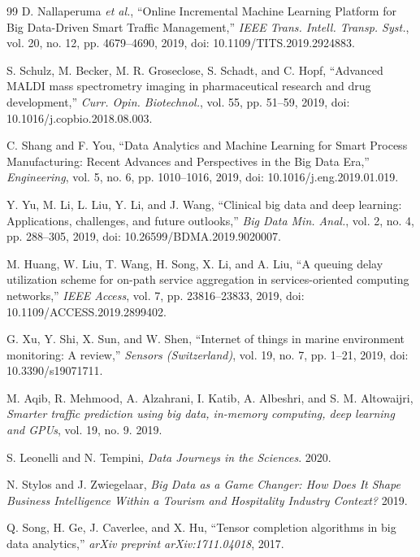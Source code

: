 \documentclass[10pt,a4paper]{article}
\begin{document}
\begin{thebibliography}{99}
D. Nallaperuma \textit{et al.}, ``Online Incremental Machine Learning Platform for Big Data-Driven Smart Traffic Management,'' \textit{IEEE Trans. Intell. Transp. Syst.}, vol. 20, no. 12, pp. 4679--4690, 2019, doi: 10.1109/TITS.2019.2924883.

S. Schulz, M. Becker, M. R. Groseclose, S. Schadt, and C. Hopf, ``Advanced MALDI mass spectrometry imaging in pharmaceutical research and drug development,'' \textit{Curr. Opin. Biotechnol.}, vol. 55, pp. 51--59, 2019, doi: 10.1016/j.copbio.2018.08.003.

C. Shang and F. You, ``Data Analytics and Machine Learning for Smart Process Manufacturing: Recent Advances and Perspectives in the Big Data Era,'' \textit{Engineering}, vol. 5, no. 6, pp. 1010--1016, 2019, doi: 10.1016/j.eng.2019.01.019.

Y. Yu, M. Li, L. Liu, Y. Li, and J. Wang, ``Clinical big data and deep learning: Applications, challenges, and future outlooks,'' \textit{Big Data Min. Anal.}, vol. 2, no. 4, pp. 288--305, 2019, doi: 10.26599/BDMA.2019.9020007.

M. Huang, W. Liu, T. Wang, H. Song, X. Li, and A. Liu, ``A queuing delay utilization scheme for on-path service aggregation in services-oriented computing networks,'' \textit{IEEE Access}, vol. 7, pp. 23816--23833, 2019, doi: 10.1109/ACCESS.2019.2899402.

G. Xu, Y. Shi, X. Sun, and W. Shen, ``Internet of things in marine environment monitoring: A review,'' \textit{Sensors (Switzerland)}, vol. 19, no. 7, pp. 1--21, 2019, doi: 10.3390/s19071711.

M. Aqib, R. Mehmood, A. Alzahrani, I. Katib, A. Albeshri, and S. M. Altowaijri, \textit{Smarter traffic prediction using big data, in-memory computing, deep learning and GPUs}, vol. 19, no. 9. 2019.

S. Leonelli and N. Tempini, \textit{Data Journeys in the Sciences}. 2020.

N. Stylos and J. Zwiegelaar, \textit{Big Data as a Game Changer: How Does It Shape Business Intelligence Within a Tourism and Hospitality Industry Context?} 2019.

Q. Song, H. Ge, J. Caverlee, and X. Hu, ``Tensor completion algorithms in big data analytics,'' \textit{arXiv preprint arXiv:1711.04018}, 2017.

\end{thebibliography}
\endgroup
\end{document}
